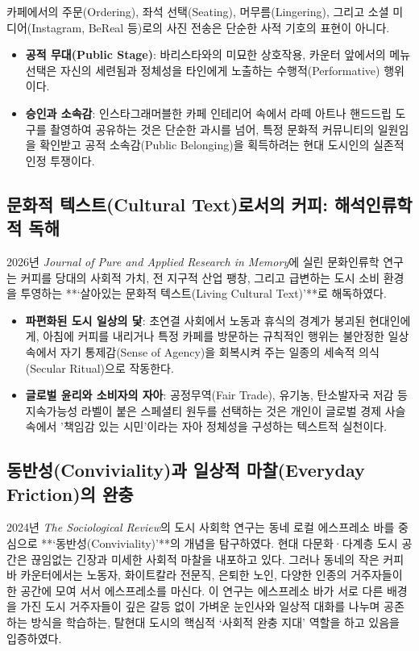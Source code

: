 \documentclass[10pt,a4paper]{article}
\begin{document}
\begin{tcolorbox}[colback=white,colframe=DeepOlive,title=Key Ethnographic Insight: 카페에서의 의식과 인정(Recognition)]
\small
카페에서의 주문(Ordering), 좌석 선택(Seating), 머무름(Lingering), 그리고 소셜 미디어(Instagram, BeReal 등)로의 사진 전송은 단순한 사적 기호의 표현이 아니다. 
\begin{itemize}[itemsep=2pt,leftmargin=1.2em]
    \item \textbf{공적 무대(Public Stage)}: 바리스타와의 미묘한 상호작용, 카운터 앞에서의 메뉴 선택은 자신의 세련됨과 정체성을 타인에게 노출하는 수행적(Performative) 행위이다.
    \item \textbf{승인과 소속감}: 인스타그래머블한 카페 인테리어 속에서 라떼 아트나 핸드드립 도구를 촬영하여 공유하는 것은 단순한 과시를 넘어, 특정 문화적 커뮤니티의 일원임을 확인받고 공적 소속감(Public Belonging)을 획득하려는 현대 도시인의 실존적 인정 투쟁이다.
\end{itemize}
\end{tcolorbox}

\subsection{문화적 텍스트(Cultural Text)로서의 커피: 해석인류학적 독해}
2026년 \textit{Journal of Pure and Applied Research in Memory}에 실린 문화인류학 연구는 커피를 당대의 사회적 가치, 전 지구적 산업 팽창, 그리고 급변하는 도시 소비 환경을 투영하는 **‘살아있는 문화적 텍스트(Living Cultural Text)’**로 해독하였다.
\begin{itemize}[itemsep=3pt]
    \item \textbf{파편화된 도시 일상의 닻}: 초연결 사회에서 노동과 휴식의 경계가 붕괴된 현대인에게, 아침에 커피를 내리거나 특정 카페를 방문하는 규칙적인 행위는 불안정한 일상 속에서 자기 통제감(Sense of Agency)을 회복시켜 주는 일종의 세속적 의식(Secular Ritual)으로 작동한다.
    \item \textbf{글로벌 윤리와 소비자의 자아}: 공정무역(Fair Trade), 유기농, 탄소발자국 저감 등 지속가능성 라벨이 붙은 스페셜티 원두를 선택하는 것은 개인이 글로벌 경제 사슬 속에서 '책임감 있는 시민'이라는 자아 정체성을 구성하는 텍스트적 실천이다.
\end{itemize}

\subsection{동반성(Conviviality)과 일상적 마찰(Everyday Friction)의 완충}
2024년 \textit{The Sociological Review}의 도시 사회학 연구는 동네 로컬 에스프레소 바를 중심으로 **‘동반성(Conviviality)’**의 개념을 탐구하였다.
현대 다문화·다계층 도시 공간은 끊임없는 긴장과 미세한 사회적 마찰을 내포하고 있다. 그러나 동네의 작은 커피 바 카운터에서는 노동자, 화이트칼라 전문직, 은퇴한 노인, 다양한 인종의 거주자들이 한 공간에 모여 서서 에스프레소를 마신다.
이 연구는 에스프레소 바가 서로 다른 배경을 가진 도시 거주자들이 깊은 갈등 없이 가벼운 눈인사와 일상적 대화를 나누며 공존하는 방식을 학습하는, 탈현대 도시의 핵심적 ‘사회적 완충 지대’ 역할을 하고 있음을 입증하였다.
\end{document}

